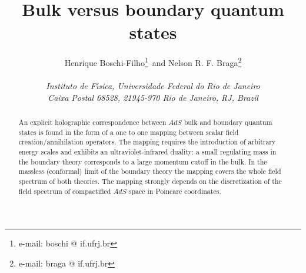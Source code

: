 \documentclass[a4paper,12pt]{article}
\begin{document}
\baselineskip=20pt

\title{Bulk versus boundary quantum states}


\author{\large Henrique Boschi-Filho\footnote{\noindent e-mail: 
boschi @ if.ufrj.br}\,  
and 
Nelson R. F. Braga\footnote{\noindent e-mail: braga @ if.ufrj.br}
\\ 
\\ 
\it Instituto de F\'\i sica, Universidade Federal do Rio de Janeiro\\
\it Caixa Postal 68528, 21945-970  Rio de Janeiro, RJ, Brazil}
 
\date{}

\maketitle

\vskip 3cm


\begin{abstract}


An explicit holographic correspondence between $AdS$ bulk and boundary quantum states 
is found in the form of a one to one mapping between scalar field
creation/annihilation operators.
The mapping requires the introduction of arbitrary energy scales and
exhibits an ultraviolet-infrared duality: a small regulating 
mass in the boundary theory corresponds to a large momentum cutoff in the bulk.
In the massless (conformal) limit of the boundary theory the mapping covers the whole 
field spectrum of both theories.
The mapping strongly depends on the discretization of the field spectrum of
compactified $AdS$ space in Poincare coordinates. 

\end{abstract}



\vfill\eject

\end{document}
